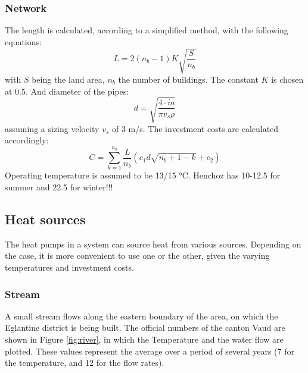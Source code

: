 \documentclass{article}
\begin{document}
\subsubsection{Network}
The length is calculated, according to a simplified method\cite{girardinEnerGisGeographicalInformation2010}, with the following equations:
\begin{equation}
    L = 2(n_{b}-1)K\sqrt{\frac{S}{n_{b}}}
\end{equation}
with $S$ being the land area, $n_{b}$ the number of buildings. The constant $K$ is chosen at 0.5.
And diameter of the pipes:
\begin{equation}
    d = \sqrt{\frac{4\cdot \dot{m}}{\pi v_{s} \rho}}
\end{equation}
assuming a sizing velocity $v_{s}$ of 3 m/s.
The investment costs are calculated accordingly:
\begin{equation}
    C = \sum_{k=1}^{n_{b}} \frac{L}{n_{b}} (c_{1} d \sqrt{n_{b}+1-k} + c_{2})
\end{equation}
Operating temperature is assumed to be 13/15 \si{\celsius}.
Henchoz\cite{henchozPotentialRefrigerantBased} has 10-12.5 for summer and 22.5 for winter!!! 

\subsection{Heat sources}
The heat pumps in a system can source heat from various sources. Depending on the case, it is more convenient to use one or the other, given the varying temperatures and investment costs.

\subsubsection{Stream}
A small stream flows along the eastern boundary of the area, on which the Eglantine district is being built. The official numbers of the canton Vaud \cite{veillehydro-meteorologiqueducantondevaudMorgesRiviereDebit} are shown in Figure \ref{fig:river}, in which the Temperature and the water flow are plotted. These values represent the average over a period of several years (7 for the temperature, and 12 for the flow rates). 
\end{document}

